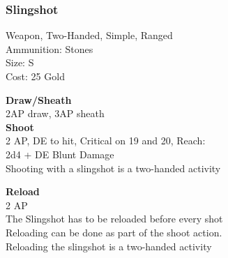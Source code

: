 \subsubsection{Slingshot}\label{weapon:slingshot}
Weapon, Two-Handed, Simple, Ranged\\
Ammunition: Stones\\
Size: S\\
Cost: 25 Gold

\textbf{Draw/Sheath}\\
2AP draw, 3AP sheath\\

\textbf{Shoot}\\
2 AP, DE to hit, Critical on 19 and 20,  Reach:\\
2d4 + \texttimes DE Blunt Damage\\
Shooting with a slingshot is a two-handed activity

\textbf{Reload}\\
2 AP\\
The Slingshot has to be reloaded before every shot\\
Reloading can be done as part of the shoot action.\\
Reloading the slingshot is a two-handed activity
